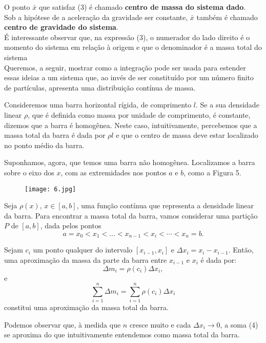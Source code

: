 \documentclass[12pt,a4paper]{report}
\begin{document}
O ponto $\bar{x}$ que satisfaz (3) é chamado \textbf{centro de massa do sistema dado}.\\

Sob a hipótese de a aceleração da gravidade ser constante, $\bar{x}$ também é chamado \textbf{centro de gravidade do sistema}.\\
É interessante observar que, na expressão (3), o numerador do lado direito é o momento do sistema em relação à origem e que o denominador é a massa total do sistema\\

Queremos, a seguir, mostrar como a integração pode ser usada para estender essas ideias a um sistema que, ao invés de ser constituído por um número finito de partículas, apresenta uma distribuição contínua de massa.

Consideremos uma barra horizontal rígida, de comprimento $l$. Se a sua densidade linear $\rho$, que é definida como massa por unidade de comprimento, é constante, dizemos que a barra é homogênea. Neste caso, intuitivamente, percebemos que a massa total da barra é dada por $\rho l$ e que o centro de massa deve estar localizado no ponto médio da barra.

Suponhamos, agora, que temos uma barra não homogênea. Localizamos a barra sobre o eixo dos $x$, com as extremidades nos pontos $a$ e $b$, como a Figura 5.

\begin{figure}[H]
    \centering
    \texttt{[image: 6.jpg]} %
    \caption{}
    \label{fig:ce}
\end{figure}
Seja $\rho(x)$, $x \in [a, b]$, uma função contínua que representa a densidade linear da barra. Para encontrar a massa total da barra, vamos considerar uma partição $P$ de $[a, b]$, dada pelos pontos
\[
a = x_0 < x_1 < \dots < x_{n-1} < x_i <\cdots < x_n = b.
\]

Sejam $c_i$ um ponto qualquer do intervalo $[x_{i-1}, x_i]$ e $\Delta x_i = x_i - x_{i-1}$. Então, uma aproximação da massa da parte da barra entre $x_{i-1}$ e $x_i$ é dada por:
\[
\Delta m_i = \rho(c_i) \Delta x_i,
\]
e
\begin{equation}
\sum_{i=1}^n \Delta m_i = \sum_{i=1}^n \rho(c_i) \Delta x_i
\end{equation}
constitui uma aproximação da massa total da barra.

Podemos observar que, à medida que $n$ cresce muito e cada $\Delta x_i \to 0$, a soma (4) se aproxima do que intuitivamente entendemos como massa total da barra.
\end{document}
